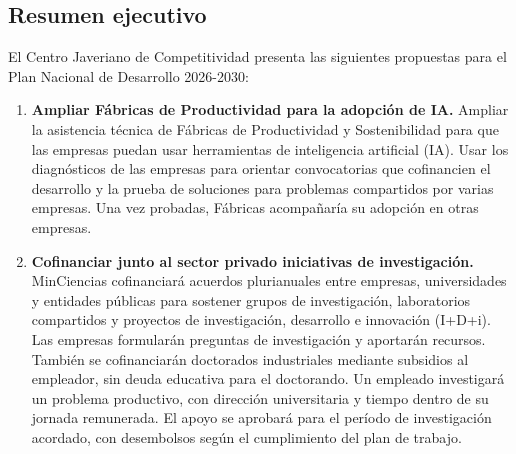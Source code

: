 \begingroup
\begin{mdframed}[linewidth=1pt,linecolor=gray!60,backgroundcolor=gray!6,
  innertopmargin=12pt,innerbottommargin=12pt,innerleftmargin=14pt,innerrightmargin=14pt]
\section*{Resumen ejecutivo}
El Centro Javeriano de Competitividad presenta las siguientes propuestas para el Plan Nacional de Desarrollo 2026-2030:

\begin{enumerate}[label=\arabic*.,leftmargin=*,itemsep=4pt,parsep=0pt,topsep=6pt]
\item \textbf{Ampliar Fábricas de Productividad para la adopción de IA.} Ampliar la asistencia técnica de Fábricas de Productividad y Sostenibilidad para que las empresas puedan usar herramientas de inteligencia artificial (IA). Usar los diagnósticos de las empresas para orientar convocatorias que cofinancien el desarrollo y la prueba de soluciones para problemas compartidos por varias empresas. Una vez probadas, Fábricas acompañaría su adopción en otras empresas.
\item \textbf{Cofinanciar junto al sector privado iniciativas de investigación.} MinCiencias cofinanciará acuerdos plurianuales entre empresas, universidades y entidades públicas para sostener grupos de investigación, laboratorios compartidos y proyectos de investigación, desarrollo e innovación (I+D+i). Las empresas formularán preguntas de investigación y aportarán recursos. También se cofinanciarán doctorados industriales mediante subsidios al empleador, sin deuda educativa para el doctorando. Un empleado investigará un problema productivo, con dirección universitaria y tiempo dentro de su jornada remunerada. El apoyo se aprobará para el período de investigación acordado, con desembolsos según el cumplimiento del plan de trabajo.

\end{enumerate}
\end{mdframed}
